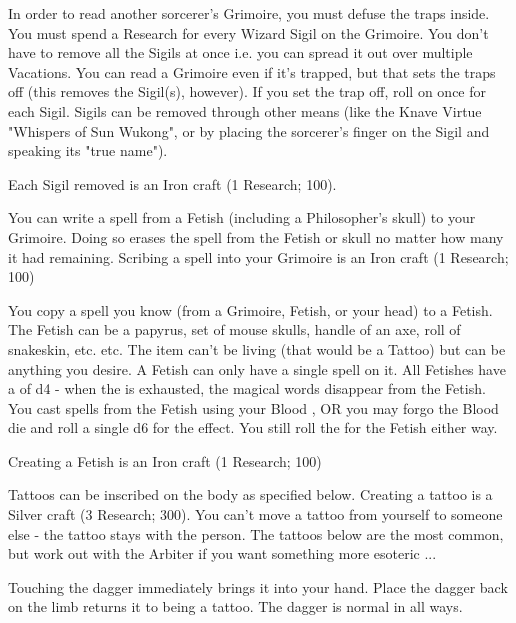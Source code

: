 In order to read another sorcerer's Grimoire, you must defuse the traps inside.  You must spend a Research for every Wizard Sigil on the Grimoire.  You don't have to remove all the Sigils at once i.e. you can spread it out over multiple Vacations.  You can read a Grimoire even if it's trapped, but that sets the traps off (this removes the Sigil(s), however).  If you set the trap off, roll on  once for each Sigil.  Sigils can be removed through other means (like the Knave Virtue "Whispers of Sun Wukong", or by placing the sorcerer's finger on the Sigil and speaking its "true name").

Each Sigil removed is an Iron craft (1 Research; 100\FE).


You can write a spell from a Fetish (including a Philosopher's skull) to your Grimoire.  Doing so erases the spell from the Fetish or skull no matter how many \UD it had remaining.  Scribing a spell into your Grimoire is an Iron craft (1 Research; 100\FE)


You copy a spell you know (from a Grimoire, Fetish, or your head) to a Fetish.  The Fetish can be a papyrus, set of mouse skulls, handle of an axe, roll of snakeskin, etc. etc.  The item can't be living (that would be a Tattoo) but can be anything you desire.  A Fetish can only have a single spell on it.  All Fetishes have a \UD of d4 - when the \UD is exhausted, the magical words disappear from the Fetish.  You cast spells from the Fetish using your Blood \POOL, OR you may forgo the Blood die and roll a single d6 for the effect.  You still roll the \UD for the Fetish either way.

Creating a Fetish is an Iron craft (1 Research; 100\FE)



Tattoos can be inscribed on the body as specified below.  Creating a tattoo is a Silver craft (3 Research; 300\AG).  You can't move a tattoo from yourself to someone else - the tattoo stays with the person.  The tattoos below are the most common, but work out with the Arbiter if you want something more esoteric ...


Touching the dagger immediately brings it into your hand.  Place the dagger back on the limb returns it to being a tattoo.  The dagger is normal in all ways.


